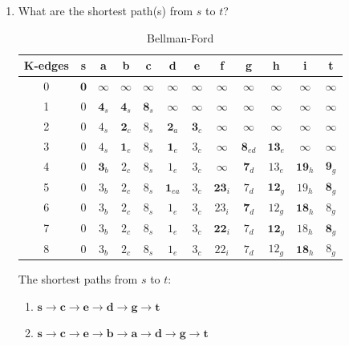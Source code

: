 \documentclass[12pt]{article}
\begin{document}
\begin{enumerate}
  \item[(a)] What are the shortest path(s) from $s$ to $t$?

    \begin{table}[H]
    \centering
    \caption{Bellman-Ford}
    \label{tab:simple3col}
    \begin{tabular}{|c|c|c|c|c|c|c|c|c|c|c|c|}   
        \hline
        \textbf{K-edges} & \textbf{s} & \textbf{a} & \textbf{b} & \textbf{c} & \textbf{d} & \textbf{e} & \textbf{f} & \textbf{g} & \textbf{h} & \textbf{i} & \textbf{t}\\
        \hline
        0 & $ \textbf{0} $ & $\infty$ & $\infty$ & $\infty$ & $\infty$ & $\infty$ & $\infty$ & $\infty$ & $\infty$ & $\infty$ & $\infty$\\
        \hline
        1 & $ 0 $ & $\textbf{4}_s$ & $\textbf{4}_s$ & $\textbf{8}_s$ & $\infty$ & $\infty$ & $\infty$ & $\infty$ & $\infty$ & $\infty$ & $\infty$\\
        \hline
        2 & $ 0 $ & $4_s$ & $\textbf{2}_c$ & $8_s$ & $\textbf{2}_a$ & $\textbf{3}_c$ & $\infty$ & $\infty$ & $\infty$ & $\infty$ & $\infty$\\
        \hline
        3 & $ 0 $ & $4_s$ & $\textbf{1}_{e}$ & $8_s$ & $\textbf{1}_e$ & $3_c$ & $\infty$ & $\textbf{8}_{ed}$ & $\textbf{13}_e$ & $\infty$ & $\infty$\\
        \hline
        4 & $ 0 $ & $\textbf{3}_{b}$ & $2_c$ & $8_s$ & $1_e$ & $3_c$ & $\infty$ & $\textbf{7}_{d}$ & $13_e$ & $\textbf{19}_h$ & $\textbf{9}_g$\\
        \hline
        5 & $ 0 $ & $3_b$ & $2_c$ & $8_s$ & $\textbf{1}_{ea}$ & $3_c$ & $\textbf{23}_i$ & $7_{d}$ & $\textbf{12}_g$ & $19_h$ & $\textbf{8}_g$\\
        \hline
        6 & $ 0 $ & $3_b$ & $2_c$ & $8_s$ & $1_e$ & $3_c$ & $23_i$ & $\textbf{7}_{d}$ & $12_g$ & $\textbf{18}_h$ & $8_g$\\
        \hline
        7 & $ 0 $ & $3_b$ & $2_c$ & $8_s$ & $1_e$ & $3_c$ & $\textbf{22}_i$ & $7_{d}$ & $\textbf{12}_g$ & $18_h$ & $\textbf{8}_g$\\
        \hline
        8 & $ 0 $ & $3_b$ & $2_c$ & $8_s$ & $1_e$ & $3_c$ & $22_i$ & $7_{d}$ & $12_g$ & $\textbf{18}_h$ & $8_g$\\
        \hline
    \end{tabular}
    \end{table}

    The shortest paths from $s$ to $t$: 
    \begin{enumerate}
      \item $\textbf{s} \rightarrow \textbf{c} \rightarrow \textbf{e} \rightarrow \textbf{d} \rightarrow \textbf{g} \rightarrow \textbf{t}$
      \item $\textbf{s} \rightarrow \textbf{c} \rightarrow \textbf{e} \rightarrow \textbf{b} \rightarrow \textbf{a} \rightarrow \textbf{d} \rightarrow \textbf{g} \rightarrow \textbf{t}$
    \end{enumerate}



\end{enumerate}
\end{document}
